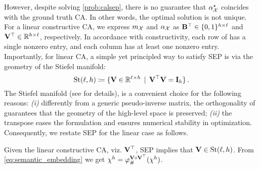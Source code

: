  However, despite solving \cref{prob:calsep}, there is no guarantee that $\alpha_{\mathcal{X}}^\star$ coincides with the ground truth CA. In other words, the optimal solution is not unique.
For a linear constructive CA, we express $m_\mathcal{X}$ and $\alpha_{\mathcal{X}}$ as $\mathbf{B}^\top\in\{0,1\}^{h \times \ell}$ and $\mathbf{V}^\top \in \mathbb{R}^{h\times\ell}$, respectively.
In accordance with constructivity, each row of \B has a single nonzero entry, and each column has at least one nonzero entry. Importantly, for linear CA, a simple yet principled way to satisfy SEP is %
via the geometry of the Stiefel manifold:
\begin{equation}\label{eq:stiefel}
    \mathrm{St}({\ell},{h}) \coloneqq \{ \mathbf{V} \in \mathbb{R}^{\ell \times h} \, \mid \, \mathbf{V}^\top\mathbf{V} = \mathbf{I}_h \}\,.
\end{equation}
The Stiefel manifold (see  for details), is a convenient choice for the following reasons: \emph{(i)} differently from a generic pseudo-inverse matrix, the orthogonality of \V guarantees that the geometry of the high-level space is preserved; \emph{(ii)} the transpose eases the formulation and ensures numerical stability in optimization. Consequently, we restate SEP for the linear case as follows.
\begin{definition}\label{def:semantic_embedding_principle_linear}
    Given the linear constructive CA, viz. $\mathbf{V}^\top$, SEP implies that $\mathbf{V} \in \mathrm{St}({\ell},{h})$. From \cref{eq:semantic_embedding} we get $\chi^h=\varphi^{\mathbf{V} \circ \mathbf{V}^\top}_{\#}(\chi^h)$.
\end{definition}

